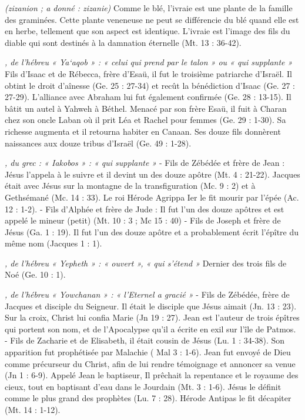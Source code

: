 \begin{multicols}{2}
\textit{(zizanion ; a donné : zizanie)}\newline
Comme le blé, l'ivraie est une plante de la famille des graminées.
Cette plante veneneuse ne peut se différencie du blé quand elle est en herbe, tellement que son aspect est identique. L'ivraie est l'image des fils du diable qui sont destinés à la damnation éternelle (Mt. 13 : 36-42).

\textit{, de l'hébreu « Ya`aqob » : « celui qui prend par le talon » ou « qui supplante »}\newline
Fils d'Isaac et de Rébecca, frère d'Esaü, il fut le troisième patriarche d'Israël. Il obtint le droit d’aînesse (Ge. 25 : 27-34) et recût la bénédiction d'Isaac (Ge. 27 : 27-29). L'alliance avec Abraham lui fut également confirmée (Ge. 28 : 13-15). Il bâtit un autel à Yahweh à Béthel. Menacé par son frère Esaü, il fuit à Charan chez son oncle Laban où il prit Léa et Rachel pour femmes (Ge. 29 : 1-30). Sa richesse augmenta et il retourna habiter en Canaan. Ses douze fils donnèrent naissances aux douze tribus d'Israël (Ge. 49 : 1-28).

\textit{, du grec : « Iakobos » : « qui supplante »}\newline
- Fils de Zébédée et frère de Jean : Jésus l'appela à le suivre et il devint un des douze apôtre (Mt. 4 : 21-22). Jacques était avec Jésus sur la montagne de la transfiguration (Mc. 9 : 2) et à Gethsémané (Mc. 14 : 33). Le roi Hérode Agrippa Ier le fit mourir par l'épée (Ac. 12 : 1-2).
- Fils d'Alphée et frère de Jude : Il fut l'un des douze apôtres et est appelé le mineur (petit) (Mt. 10 : 3 ; Mc 15 : 40)
- Fils de Joseph et frère de Jésus (Ga. 1 : 19). Il fut l'un des douze apôtre et a probablement écrit l'épître du même nom (Jacques 1 : 1).

\textit{, de l'hébreu « Yepheth » : « ouvert », « qui s'étend »}\newline
Dernier des trois fils de Noé (Ge. 10 : 1).

\textit{, de l'hébreu « Yowchanan » : « l'Eternel a gracié »}\newline
- Fils de Zébédée, frère de Jacques et disciple du Seigneur. Il était le disciple que Jésus aimait (Jn. 13 : 23). Sur la croix, Christ lui confia Marie (Jn 19 : 27). Jean est l'auteur de trois épîtres qui portent son nom, et de l'Apocalypse qu'il a écrite en exil sur l'île de Patmos.
- Fils de Zacharie et de Elisabeth, il était cousin de Jésus (Lu. 1 : 34-38). Son apparition fut prophétisée par Malachie ( Mal 3 : 1-6). Jean fut envoyé de Dieu comme précurseur du Christ, afin de lui rendre témoignage et annoncer sa venue (Jn 1 : 6-9). Appelé Jean le baptiseur, Il prêchait la repentance et le royaume des cieux, tout en baptisant d'eau dans le Jourdain (Mt. 3 : 1-6). Jésus le définit comme le plus grand des prophètes (Lu. 7 : 28). Hérode Antipas le fit décapiter (Mt. 14 : 1-12).


\end{multicols}

